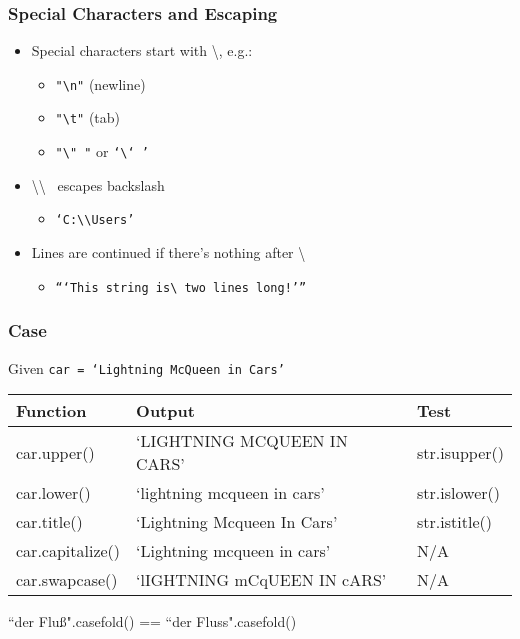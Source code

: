 \documentclass{beamer}
\begin{document}
%
%
\begin{frame}
  \frametitle{Special Characters and Escaping}
  \begin{itemize}
    \item Special characters start with \textbackslash, e.g.: 
      \begin{itemize}
        \item \texttt{"\textbackslash n"} (newline)
        \item \texttt{"\textbackslash t"} (tab)
	\item \texttt{"\textbackslash " "} or \texttt{`\textbackslash ` '} 
      \end{itemize}

    \item \textbackslash \textbackslash~ escapes backslash 
      \begin{itemize}
        \item \texttt{`C:\textbackslash\textbackslash Users'}
      \end{itemize}

    \item Lines are continued if there's nothing after \textbackslash 
      \begin{itemize}
        \item \texttt{```This string is\textbackslash\\two lines long!'''}
      \end{itemize}
  \end{itemize}
\end{frame}


%
%
\begin{frame}
  \frametitle{Case}
  Given \texttt{car = `Lightning McQueen in Cars'}
  \begin{table}
    \begin{tabular}{l | l | l}
    Function & Output & Test \\
    \hline
    car.upper() & `LIGHTNING MCQUEEN IN CARS' & str.isupper() \\
    car.lower() & `lightning mcqueen in cars' & str.islower() \\
    car.title() & `Lightning Mcqueen In Cars' & str.istitle() \\
    car.capitalize() & `Lightning mcqueen in cars' & N/A \\
    car.swapcase() & `lIGHTNING mCqUEEN IN cARS' & N/A \\
    \end{tabular}
  \end{table}
  ``der Flu\ss".casefold() == ``der Fluss".casefold()
\end{frame}
\end{document}
